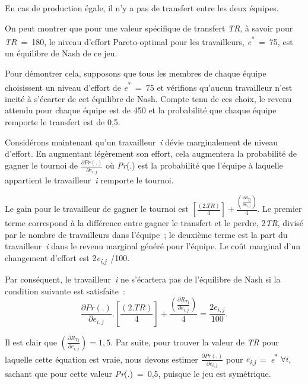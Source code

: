 \begin{Article}
\begin{refsection}[Lebourges]
\begin{appendices}
En cas de production égale, il n'y a pas de transfert entre les deux
équipes.

On peut montrer que pour une valeur spécifique de transfert \emph{TR}, à
savoir pour \emph{TR~}=~180, le niveau d'effort Pareto-optimal pour les
travailleurs, \emph{e}\textsuperscript{*}~=~75, est un équilibre de Nash
de ce jeu.

Pour démontrer cela, supposons que tous les membres de chaque équipe
choisissent un niveau d'effort de \emph{e}\textsuperscript{*}~=~75 et
vérifions qu'aucun travailleur n'est incité à s'écarter de cet équilibre
de Nash. Compte tenu de ces choix, le revenu attendu pour chaque équipe
est de 450 et la probabilité que chaque équipe remporte le transfert est
de 0,5.

Considérons maintenant qu'un travailleur~\emph{i} dévie marginalement de
niveau d'effort. En augmentant légèrement son effort, cela augmentera la
probabilité de gagner le tournoi de
\(\frac{\partial Pr(.)}{\partial e_{i,j}}\) où \emph{Pr}(.) est la
probabilité que l'équipe à laquelle appartient le travailleur~\emph{i}
remporte le tournoi.

Le gain pour le travailleur de gagner le tournoi est
\(\left\lbrack \frac{(2.TR)}{4} \right\rbrack + \frac{\left( \frac{\partial R_{Tj}}{\partial e_{i,j}} \right)}{4}\).
Le premier terme correspond à la différence entre gagner le transfert et
le perdre, 2\emph{TR}, divisé par le nombre de travailleurs dans
l'équipe~; le deuxième terme est la part du travailleur~\emph{i} dans le
revenu marginal généré pour l'équipe. Le coût marginal d'un changement
d'effort est 2\emph{e\textsubscript{i}}\textsubscript{,\emph{j}}~/100.

Par conséquent, le travailleur~\emph{i} ne s'écartera pas de l'équilibre
de Nash si la condition suivante est satisfaite~:
\begin{equation}
    \frac{\partial Pr(.)}{\partial e_{i,j}}.\left\lbrack \frac{(2.TR)}{4} \right\rbrack + \frac{\left( \frac{\partial R_{Tj}}{\partial e_{i,j}} \right)}{4} = \frac{2e_{i,j}}{100}.
\end{equation}

Il est clair que
\(\left( \frac{\partial R_{Tj}}{\partial e_{i,j}} \right) = 1,5.\) Par
suite, pour trouver la valeur de \emph{TR} pour laquelle cette équation
est vraie, nous devons estimer
\(\frac{\partial Pr(.)}{\partial e_{i,j}}\) pour
\emph{e\textsubscript{i}}\textsubscript{,\emph{j}}~=~\emph{e}\textsuperscript{*}
$\forall\emph{i}$, sachant que pour cette valeur \emph{Pr}(.)~=~0,5, puisque le
jeu est symétrique.


\end{appendices}
\end{refsection}
\end{Article}

